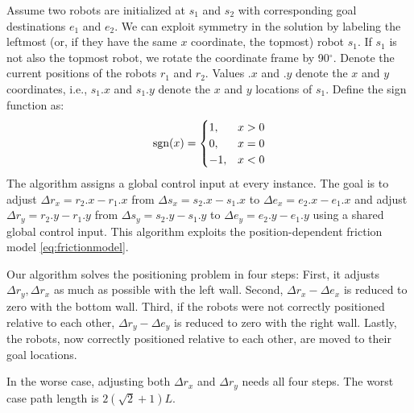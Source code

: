 Assume two robots are initialized at $s_1$ and $s_2$ with corresponding goal destinations $e_1$ and $e_2$. 
We can exploit symmetry in the solution by labeling the leftmost  (or, if they have the same $x$ coordinate, the topmost) robot $s_1$.  If $s_1$ is not also the topmost robot, we rotate the coordinate frame by 90$^\circ$.
Denote the current positions of the robots  $r_1$ and $r_2$. 
Values $.x$ and $.y$ denote the $x$ and $y$ coordinates, i.e., $s_1.x$ and $s_1.y$ denote the $x$ and $y$ locations of $s_1$. Define the sign function as:
\begin{align}
\operatorname{sgn} (x) = \begin{cases}  1, &  x > 0 \\
0, & x=0\\
-1, & x<0 \end{cases} 
\end{align}
The algorithm assigns a global control input at every instance.
The goal is to adjust 
 $\Delta r_x = r_2.x-r_1.x$ from $\Delta s_x = s_2.x-s_1.x$ to $\Delta e_x = e_2.x-e_1.x$ and  adjust 
 $\Delta r_y = r_2.y-r_1.y$ from $\Delta s_y = s_2.y-s_1.y$ to $\Delta e_y = e_2.y-e_1.y$ using a shared global control input. 
 This algorithm exploits the position-dependent friction model \eqref{eq:frictionmodel}.

Our algorithm solves the positioning problem in four steps: 
First, it adjusts $\Delta r_y , \Delta r_x$ as much as possible with the left wall.
Second, $\Delta r_x -\Delta e_x$ is reduced to zero with the bottom wall.
Third, if the robots were not correctly positioned relative to each other, $\Delta r_y -\Delta e_y$ is reduced to zero with the right wall.
Lastly, the robots, now correctly positioned relative to each other, are moved to their goal locations.

In the worse case, adjusting both $\Delta r_x$ and $\Delta r_y$ needs all four steps. The worst case path length is $2(\sqrt{2}+1)L$.





